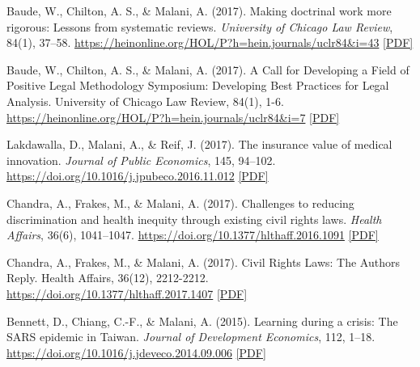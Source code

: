 \begin{tablist}
        \item[2017] \tab{}Baude, W., Chilton, A. S., \& Malani, A. (2017). Making doctrinal work more rigorous: Lessons from systematic reviews. \textit{University of Chicago Law Review}, 84(1), 37–58. \href{https://heinonline.org/HOL/P?h=hein.journals/uclr84&i=43}{https://heinonline.org/HOL/P?h=hein.journals/uclr84\&i=43} \href{https://github.com/anup-malani/website_personal/blob/main/publications/2017_BaudeChiltonMalani_UCLR_DoctrinalMethod.pdf}{[PDF]}

        \item[2017] \tab{}Baude, W., Chilton, A. S., \& Malani, A. (2017). A Call for Developing a Field of Positive Legal Methodology Symposium: Developing Best Practices for Legal Analysis. University of Chicago Law Review, 84(1), 1-6. \href{https://heinonline.org/HOL/P?h=hein.journals/uclr84&i=7}{https://heinonline.org/HOL/P?h=hein.journals/uclr84\&i=7} \href{https://github.com/anup-malani/website_personal/blob/main/publications/2017_BaudeMalani_PositiveLegalMethodology.pdf}{[PDF]}
        
        \item[2017] \tab{}Lakdawalla, D., Malani, A., \& Reif, J. (2017). The insurance value of medical innovation. \textit{Journal of Public Economics}, 145, 94–102. \href{https://doi.org/10.1016/j.jpubeco.2016.11.012}{https://doi.org/10.1016/j.jpubeco.2016.11.012} \href{https://github.com/anup-malani/website_personal/blob/main/publications/2017_LakdawallaMalaniReif_JPubEcon_ValueInnovation.pdf}{[PDF]}
        
        \item[2017] \tab{}Chandra, A., Frakes, M., \& Malani, A. (2017). Challenges to reducing discrimination and health inequity through existing civil rights laws. \textit{Health Affairs}, 36(6), 1041–1047. \href{https://doi.org/10.1377/hlthaff.2016.1091}{https://doi.org/10.1377/hlthaff.2016.1091} \href{https://github.com/anup-malani/website_personal/blob/main/publications/2017_ChandraFrakesMalani_HealthAffairs_CivilRights.pdf}{[PDF]}

        \item[] \tab{}Chandra, A., Frakes, M., \& Malani, A. (2017). Civil Rights Laws: The Authors Reply. Health Affairs, 36(12), 2212-2212. \href{https://doi.org/10.1377/hlthaff.2017.1407}{https://doi.org/10.1377/hlthaff.2017.1407} \href{https://github.com/anup-malani/website_personal/blob/main/publications/2017_ChandraMalani_ReplyCivilRights.pdf}{[PDF]}
        
        \item[2015] \tab{}Bennett, D., Chiang, C.-F., \& Malani, A. (2015). Learning during a crisis: The SARS epidemic in Taiwan. \textit{Journal of Development Economics}, 112, 1–18. \href{https://doi.org/10.1016/j.jdeveco.2014.09.006}{https://doi.org/10.1016/j.jdeveco.2014.09.006} \href{https://github.com/anup-malani/website_personal/blob/main/publications/2015_BennettChiangMalani_JDE_SARSLearning.pdf}{[PDF]}
        

\end{tablist}
